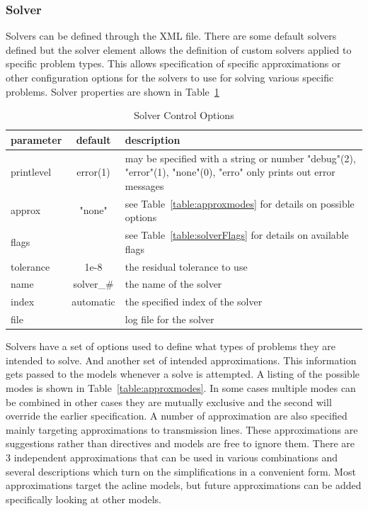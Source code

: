 \documentclass[12pt]{article} %
\begin{document}
 \subsubsection{Solver}
 Solvers can be defined through the XML file.  There are some default solvers defined but the solver element allows the definition of custom solvers applied to specific problem types.  This allows specification of specific approximations or other configuration options for the solvers to use for solving various specific problems.  Solver properties are shown in Table~\ref{table:solverOptions}
 
  \begin{table}[ht]
  	
  	\caption{Solver Control Options} %
  	\centering %
  	\begin{tabular}{l c p{8cm}} %
  		\hline %
  		parameter & default & description \\ [0.5ex] %
  		\hline %
  		printlevel & error(1) & may be specified with a string or number "debug"(2), "error"(1), "none"(0), "erro" only prints out error messages \\ %
  		approx & "none" & see Table~\ref{table:approxmodes} for details on possible options \\
  		flags &  & see Table~\ref{table:solverFlags} for details on available flags \\
  		tolerance & 1e-8 & the residual tolerance to use\\
  		name & solver\_\# & the name of the solver \\
  		index & automatic & the specified index of the solver \\
  		file & & log file for the solver \\%
  		\hline %
  	\end{tabular}
  	\label{table:solverOptions}
  \end{table}
  Solvers have a set of options used to define what types of problems they are intended to solve. And another set of intended approximations.  This information gets passed to the models whenever a solve is attempted.  A listing of the possible modes is shown in Table~\ref{table:approxmodes}.  In some cases multiple modes can be combined in other cases they are mutually exclusive and the second will override the earlier specification.  A number of approximation are also specified mainly targeting approximations to transmission lines.  These approximations are suggestions rather than directives and models are free to ignore them.  There are 3 independent approximations that can be used in various combinations and several descriptions which turn on the simplifications in a convenient form.  Most approximations target the acline models, but future approximations can be added specifically looking at other models. 
\end{document}
